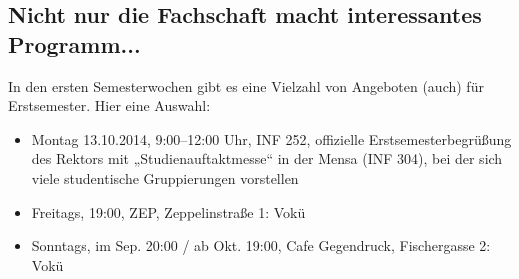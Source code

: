 \subsection{Nicht nur die Fachschaft macht interessantes Programm...}
In den ersten Semesterwochen gibt es eine Vielzahl von Angeboten (auch) für Erstsemester. Hier eine Auswahl:
\begin{itemize}
\item Montag 13.10.2014, 9:00–12:00 Uhr, \gls{INF} 252, offizielle Erstsemesterbegrüßung des Rektors mit „Studienauftaktmesse“ in der Mensa (\gls{INF} 304), bei der sich viele studentische Gruppierungen vorstellen
\item Freitags, 19:00, ZEP, Zeppelinstraße 1: Vokü
\item Sonntags, im Sep. 20:00 / ab Okt. 19:00, Cafe Gegendruck, Fischergasse 2: Vokü

\end{itemize}
